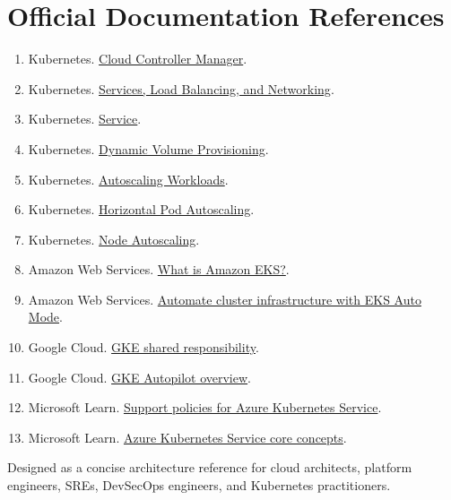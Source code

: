 \documentclass[11pt]{article}
\begin{document}
\section*{Official Documentation References}
\begin{enumerate}[leftmargin=1.6em]
  \item Kubernetes. \href{https://kubernetes.io/docs/concepts/architecture/cloud-controller/}{Cloud Controller Manager}.
  \item Kubernetes. \href{https://kubernetes.io/docs/concepts/services-networking/}{Services, Load Balancing, and Networking}.
  \item Kubernetes. \href{https://kubernetes.io/docs/concepts/services-networking/service/}{Service}.
  \item Kubernetes. \href{https://kubernetes.io/docs/concepts/storage/dynamic-provisioning/}{Dynamic Volume Provisioning}.
  \item Kubernetes. \href{https://kubernetes.io/docs/concepts/workloads/autoscaling/}{Autoscaling Workloads}.
  \item Kubernetes. \href{https://kubernetes.io/docs/concepts/workloads/autoscaling/horizontal-pod-autoscale/}{Horizontal Pod Autoscaling}.
  \item Kubernetes. \href{https://kubernetes.io/docs/concepts/cluster-administration/node-autoscaling/}{Node Autoscaling}.
  \item Amazon Web Services. \href{https://docs.aws.amazon.com/eks/latest/userguide/what-is-eks.html}{What is Amazon EKS?}.
  \item Amazon Web Services. \href{https://docs.aws.amazon.com/eks/latest/userguide/automode.html}{Automate cluster infrastructure with EKS Auto Mode}.
  \item Google Cloud. \href{https://cloud.google.com/kubernetes-engine/docs/concepts/shared-responsibility}{GKE shared responsibility}.
  \item Google Cloud. \href{https://cloud.google.com/kubernetes-engine/docs/concepts/autopilot-overview}{GKE Autopilot overview}.
  \item Microsoft Learn. \href{https://learn.microsoft.com/en-us/azure/aks/support-policies}{Support policies for Azure Kubernetes Service}.
  \item Microsoft Learn. \href{https://learn.microsoft.com/en-us/azure/aks/core-aks-concepts}{Azure Kubernetes Service core concepts}.
\end{enumerate}

\vfill
\begin{center}
{\small\color{Slate}Designed as a concise architecture reference for cloud architects, platform engineers, SREs, DevSecOps engineers, and Kubernetes practitioners.}
\end{center}
\end{document}
